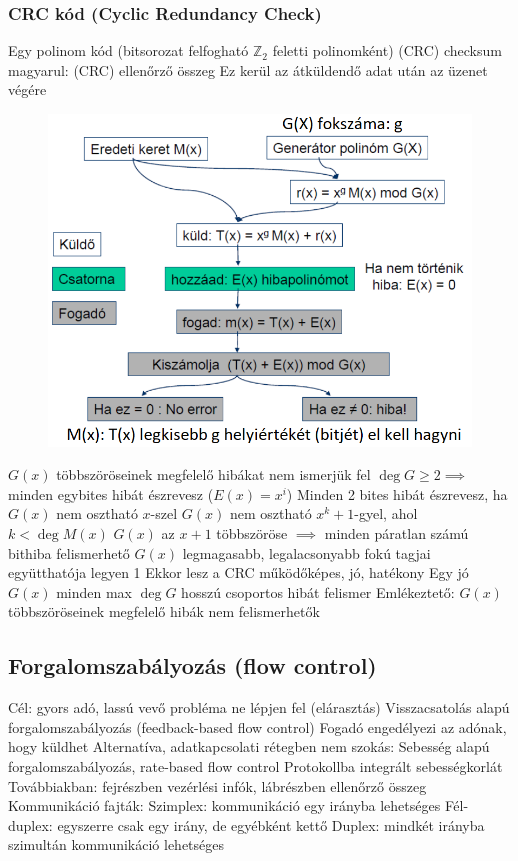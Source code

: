 \documentclass[12pt,a4paper]{article}
\begin{document}
\pagebreak

\subsubsection{CRC kód (Cyclic Redundancy Check)}

\begin{outline}
	\1 Egy polinom kód (bitsorozat felfogható $\mathbb{Z}_2$ feletti polinomként)
	\1 (CRC) checksum magyarul: (CRC) ellenőrző összeg
		\2 Ez kerül az átküldendő adat után az üzenet végére
\end{outline}

\begin{figure}[h!]
	\centering
	\includegraphics[width=0.6\linewidth]{crc}
\end{figure}

\begin{outline}
	\1 $G(x)$ többszöröseinek megfelelő hibákat nem ismerjük fel
	\1 $\deg G \ge 2 \implies$ minden egybites hibát észrevesz ($E(x)=x^i$)
	\1 Minden 2 bites hibát észrevesz, ha
		\2 $G(x)$ nem osztható $x$-szel
		\2 $G(x)$ nem osztható $x^k+1$-gyel, ahol $k < \deg M(x)$
	\1 $G(x)$ az $x+1$ többszöröse $\implies$ minden páratlan számú bithiba felismerhető
	\1 $G(x)$ legmagasabb, legalacsonyabb fokú tagjai együtthatója legyen 1
		\2 Ekkor lesz a CRC működőképes, jó, hatékony
	\1 Egy jó $G(x)$ minden max $\deg G$ hosszú csoportos hibát felismer
		\2 Emlékeztető: $G(x)$ többszöröseinek megfelelő hibák nem felismerhetők
\end{outline}

\pagebreak

\subsection{Forgalomszabályozás (flow control)}

\begin{outline}
	\1 Cél: gyors adó, lassú vevő probléma ne lépjen fel (elárasztás)
	\1 Visszacsatolás alapú forgalomszabályozás (feedback-based flow control)
		\2 Fogadó engedélyezi az adónak, hogy küldhet
		\2 Alternatíva, adatkapcsolati rétegben nem szokás:
			\3 Sebesség alapú forgalomszabályozás, rate-based flow control
			\3 Protokollba integrált sebességkorlát
	\1 Továbbiakban: fejrészben vezérlési infók, lábrészben ellenőrző összeg
	\1 Kommunikáció fajták:
		\2 Szimplex: kommunikáció egy irányba lehetséges
		\2 Fél-duplex: egyszerre csak egy irány, de egyébként kettő
		\2 Duplex: mindkét irányba szimultán kommunikáció lehetséges
\end{outline}
\end{document}
